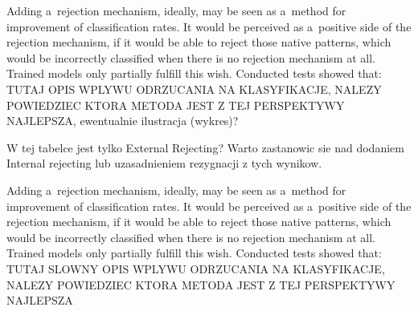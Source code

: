 \documentclass{llncs}
\begin{document}


{\color{blue}
Adding a~rejection mechanism, ideally, may be seen as a~method for improvement of classification rates. It would be perceived as a~positive side of the rejection mechanism, if it would be able to reject those native patterns, which would be incorrectly classified when there is no rejection mechanism at all. Trained models only partially fulfill this wish. Conducted tests showed that: TUTAJ OPIS WPLYWU ODRZUCANIA NA KLASYFIKACJE, NALEZY POWIEDZIEC KTORA METODA JEST Z TEJ PERSPEKTYWY NAJLEPSZA, ewentualnie ilustracja (wykres)? }

{\color{red}W tej tabelce jest tylko External Rejecting? Warto zastanowic sie nad dodaniem Internal rejecting lub uzasadnieniem rezygnacji z tych wynikow.}

{\color{blue}
Adding a~rejection mechanism, ideally, may be seen as a~method for improvement of classification rates. It would be perceived as a~positive side of the rejection mechanism, if it would be able to reject those native patterns, which would be incorrectly classified when there is no rejection mechanism at all. Trained models only partially fulfill this wish. Conducted tests showed that: TUTAJ SLOWNY OPIS WPLYWU ODRZUCANIA NA KLASYFIKACJE, NALEZY POWIEDZIEC KTORA METODA JEST Z TEJ PERSPEKTYWY NAJLEPSZA}
\end{document}
